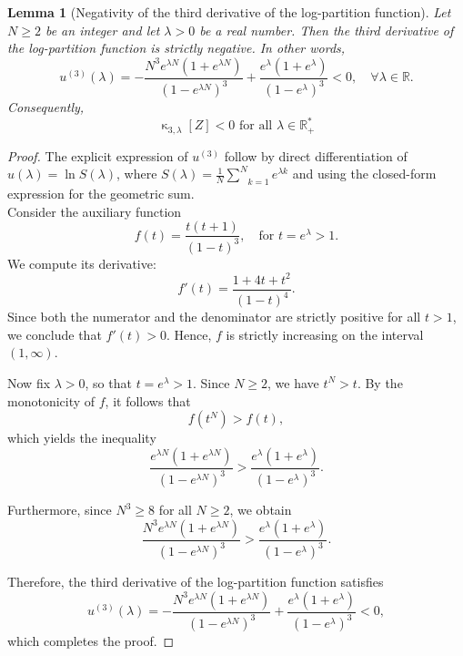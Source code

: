 \documentclass[a4paper, 10pt]{article}
\newcommand{\beq}{\begin{equation}}
\newcommand{\eeq}{\end{equation}}
\newtheorem{lemma}{Lemma}[section]
\theoremstyle{definition}
\begin{document}
\begin{lemma}
[Negativity of the third derivative of the log-partition function]\label{lemma:neg_third_deriv}
Let \( N \geq 2 \) be an integer and let \( \lambda > 0 \) be a real number. Then the third derivative of the log-partition function is strictly negative. In other words,
\beq
u^{(3)}(\lambda) = -\frac{N^3 e^{\lambda N}(1 + e^{\lambda N})}{(1 - e^{\lambda N})^3} + \frac{e^{\lambda}(1 + e^{\lambda})}{(1 - e^{\lambda})^3} < 0, \quad \forall \lambda\in \mathbb{R}.
\eeq
Consequently,
\beq
\operatorname{\kappa}_{3,\lambda}[Z] < 0 \text{ for all } \lambda \in \mathbb{R}_+^*
\eeq
\end{lemma}
\begin{proof}
The explicit expression  of \( u^{(3)}\) follow by direct differentiation of \( u(\lambda) = \ln S(\lambda) \), where $ S(\lambda) = \frac{1}{N}\underset{k=1}{\overset{N}{\sum}}e^{\lambda k}$ and using the closed-form expression for the geometric sum.\\
Consider the auxiliary function
\[
f(t) = \frac{t(t + 1)}{(1 - t)^3}, \quad \text{for } t = e^{\lambda} > 1.
\]
We compute its derivative:
\[
f'(t) = \frac{1 + 4t + t^2}{(1 - t)^4}.
\]
Since both the numerator and the denominator are strictly positive for all \( t > 1 \), we conclude that \( f'(t) > 0 \). Hence, \( f \) is strictly increasing on the interval \( (1, \infty) \).

Now fix \( \lambda > 0 \), so that \( t = e^{\lambda} > 1 \). Since \( N \geq 2 \), we have \( t^N > t \). By the monotonicity of \( f \), it follows that
\[
f(t^N) > f(t),
\]
which yields the inequality
\[
\frac{e^{\lambda N}(1 + e^{\lambda N})}{(1 - e^{\lambda N})^3} > \frac{e^{\lambda}(1 + e^{\lambda})}{(1 - e^{\lambda})^3}.
\]

Furthermore, since \( N^3 \geq 8 \) for all \( N \geq 2 \), we obtain
\[
\frac{N^3 e^{\lambda N}(1 + e^{\lambda N})}{(1 - e^{\lambda N})^3} > \frac{e^{\lambda}(1 + e^{\lambda})}{(1 - e^{\lambda})^3}.
\]

Therefore, the third derivative of the log-partition function satisfies
\[
u^{(3)}(\lambda) 
= - \frac{N^3 e^{\lambda N}(1 + e^{\lambda N})}{(1 - e^{\lambda N})^3}
+ \frac{e^{\lambda}(1 + e^{\lambda})}{(1 - e^{\lambda})^3}
< 0,
\]
which completes the proof.
\end{proof}
\end{document}
